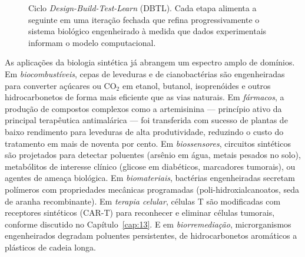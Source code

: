 \begin{figure}[htbp]
\centering
{}
\caption{Ciclo \emph{Design-Build-Test-Learn} (DBTL). Cada etapa alimenta a seguinte em uma iteração fechada que refina progressivamente o sistema biológico engenheirado à medida que dados experimentais informam o modelo computacional.}
\label{fig:14-dbtl}
\end{figure}

As aplicações da biologia sintética já abrangem um espectro amplo de domínios. Em \emph{biocombustíveis}, cepas de leveduras e de cianobactérias são engenheiradas para converter açúcares ou CO$_2$ em etanol, butanol, isoprenóides e outros hidrocarbonetos de forma mais eficiente que as vias naturais. Em \emph{fármacos}, a produção de compostos complexos como a artemisinina --- princípio ativo da principal terapêutica antimalárica --- foi transferida com sucesso de plantas de baixo rendimento para leveduras de alta produtividade, reduzindo o custo do tratamento em mais de noventa por cento. Em \emph{biossensores}, circuitos sintéticos são projetados para detectar poluentes (arsênio em água, metais pesados no solo), metabólitos de interesse clínico (glicose em diabéticos, marcadores tumorais), ou agentes de ameaça biológica. Em \emph{biomateriais}, bactérias engenheiradas secretam polímeros com propriedades mecânicas programadas (poli-hidroxialcanoatos, seda de aranha recombinante). Em \emph{terapia celular}, células T são modificadas com receptores sintéticos (CAR-T) para reconhecer e eliminar células tumorais, conforme discutido no Capítulo~\ref{cap:13}. E em \emph{biorremediação}, microrganismos engenheirados degradam poluentes persistentes, de hidrocarbonetos aromáticos a plásticos de cadeia longa.

